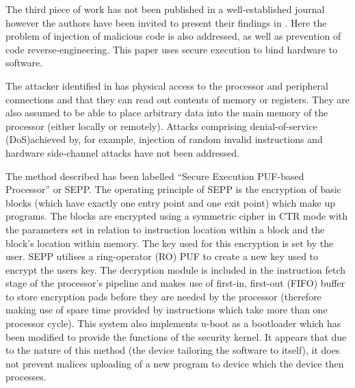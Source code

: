 The third piece of work \cite{Kleber2015} has not been published in a well-established journal however the authors have been invited to present their findings in \cite{Kleber2015a}. Here the problem of injection of malicious code is also addressed, as well as prevention of code reverse-engineering. This paper uses secure execution to bind hardware to software.

The attacker identified in \cite{Kleber2015} has physical access to the processor and peripheral connections and that they can read out contents of memory or registers. They are also assumed to be able to place arbitrary data into the main memory of the processor (either locally or remotely). Attacks comprising denial-of-service (DoS)achieved by, for example, injection of random invalid instructions and hardware side-channel attacks have not been addressed.

The method described has been labelled ``Secure Execution PUF-based Processor'' or SEPP. The operating principle of SEPP is the encryption of basic blocks (which have exactly one entry point and one exit point) which make up programs. The blocks are encrypted using a symmetric cipher in CTR mode with the parameters set in relation to instruction location within a block and the block's location within memory. The key used for this encryption is set by the user. SEPP utilises a ring-operator (RO) PUF to create a new key used to encrypt the users key. The decryption module is included in the instruction fetch stage of the processor's pipeline and makes use of first-in, first-out (FIFO) buffer to store encryption pads before they are needed by the processor (therefore making use of spare time provided by instructions which take more than one processor cycle). This system also implements u-boot as a bootloader which has been modified to provide the functions of the security kernel. It appears that due to the nature of this method (the device tailoring the software to itself), it does not prevent malices uploading of a new program to device which the device then processes.

\ifnotesincluded
{}
\fi


